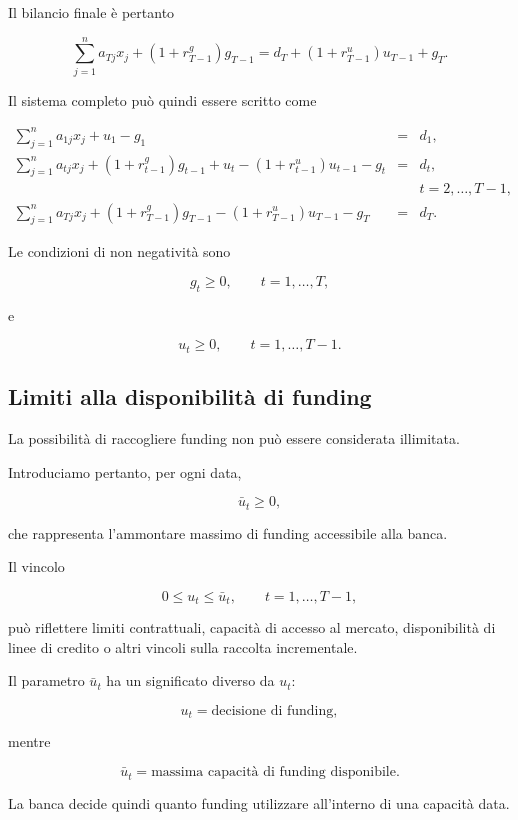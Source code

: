 Il bilancio finale \`e pertanto

\[
\sum_{j=1}^{n}a_{Tj}x_j
+
(1+r_{T-1}^{g})g_{T-1}
=
d_T
+
(1+r_{T-1}^{u})u_{T-1}
+
g_T.
\]

Il sistema completo pu\`o quindi essere scritto come

\[
\begin{array}{rcl}
\displaystyle
\sum_{j=1}^{n}a_{1j}x_j+u_1-g_1
&=&
d_1,
\\[8pt]
\displaystyle
\sum_{j=1}^{n}a_{tj}x_j
+
(1+r^g_{t-1})g_{t-1}
+
u_t
-
(1+r^u_{t-1})u_{t-1}
-
g_t
&=&
d_t,
\\
&&
t=2,\ldots,T-1,
\\[8pt]
\displaystyle
\sum_{j=1}^{n}a_{Tj}x_j
+
(1+r_{T-1}^{g})g_{T-1}
-
(1+r_{T-1}^{u})u_{T-1}
-
g_T
&=&
d_T.
\end{array}
\]

Le condizioni di non negativit\`a sono

\[
g_t\geq0,
\qquad
t=1,\ldots,T,
\]

\noindent e

\[
u_t\geq0,
\qquad
t=1,\ldots,T-1.
\]

\subsection{Limiti alla disponibilit\`a di funding}

La possibilit\`a di raccogliere funding non pu\`o essere considerata
illimitata.

Introduciamo pertanto, per ogni data,

\[
\bar{u}_t\geq0,
\]

\noindent che rappresenta l'ammontare massimo di funding accessibile alla banca.

Il vincolo

\[
0\leq u_t\leq\bar{u}_t,
\qquad
t=1,\ldots,T-1,
\]

\noindent pu\`o riflettere limiti contrattuali, capacit\`a di accesso al mercato,
disponibilit\`a di linee di credito o altri vincoli sulla raccolta
incrementale.

Il parametro $\bar{u}_t$ ha un significato diverso da $u_t$:

\[
u_t
=
\text{decisione di funding},
\]

\noindent mentre

\[
\bar{u}_t
=
\text{massima capacit\`a di funding disponibile}.
\]

La banca decide quindi quanto funding utilizzare all'interno di una
capacit\`a data.

